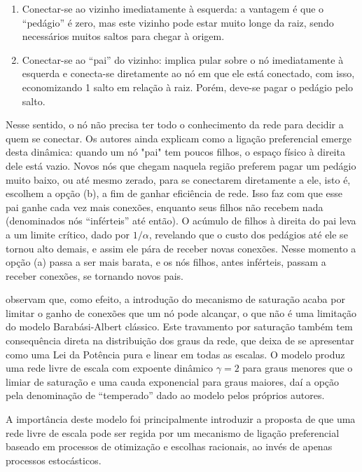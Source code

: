 \documentclass[12pt,oneside,a4paper,brazil,sumario=tradicional]{abntex2}
\begin{document}
\begin{enumerate}
  \item Conectar-se ao vizinho imediatamente à esquerda: a vantagem é que o “pedágio” é zero, mas este vizinho pode estar muito longe da raiz, sendo necessários muitos saltos para chegar à origem.
  \item Conectar-se ao “pai” do vizinho: implica pular sobre o nó imediatamente à esquerda e conecta-se diretamente ao nó em que ele está conectado, com isso, economizando 1 salto em relação à raiz. Porém, deve-se pagar o pedágio pelo salto.
\end{enumerate}

Nesse sentido, o nó não precisa ter todo o conhecimento da rede para decidir a quem se conectar. Os autores ainda explicam como a ligação preferencial emerge desta dinâmica: quando um nó "pai" tem poucos filhos, o espaço físico à direita dele está vazio. Novos nós que chegam naquela região preferem pagar um pedágio muito baixo, ou até mesmo zerado,  para se conectarem diretamente a ele, isto é, escolhem a opção (b), a fim de ganhar eficiência de rede. Isso faz com que esse pai ganhe cada vez mais conexões, enquanto seus filhos não recebem nada (denominados nós “inférteis” até então). O acúmulo de filhos à direita do pai leva a um limite crítico, dado por $1/\alpha$, revelando que o custo dos pedágios até ele se tornou alto demais, e assim ele pára de receber novas conexões. Nesse momento a opção (a) passa a ser mais barata, e os nós filhos, antes inférteis, passam a receber conexões, se tornando novos pais.

\textcite{latora2017} observam que, como efeito, a introdução do mecanismo de saturação acaba por limitar o ganho de conexões que um nó pode alcançar, o que não é uma limitação do modelo Barabási-Albert clássico. Este travamento por saturação também tem consequência direta na distribuição dos graus da rede, que deixa de se apresentar como uma Lei da Potência pura e linear em todas as escalas. O modelo produz uma rede livre de escala com expoente dinâmico $\gamma = 2$ para graus menores que o limiar de saturação e uma cauda exponencial para graus maiores, daí a opção pela denominação de “temperado” dado ao modelo pelos próprios autores.

A importância deste modelo foi principalmente introduzir a proposta de que uma rede livre de escala pode ser regida por um mecanismo de ligação preferencial baseado em processos de otimização e escolhas racionais, ao invés de apenas processos estocásticos.
\end{document}

